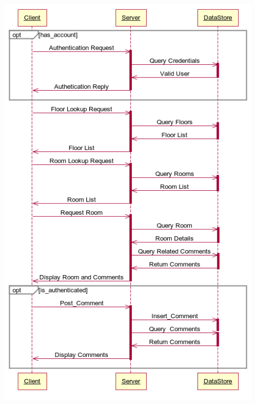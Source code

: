 \documentclass{sig-alt-release2}
\begin{document}
\begin{center}
\includegraphics[scale=0.35]{img/dia.png}
\end{center}



\end{document}
